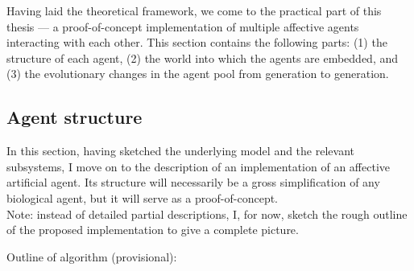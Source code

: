 Having laid the theoretical framework, we come to the practical part of this thesis --- a proof-of-concept implementation of multiple affective agents interacting with each other. This section contains the following parts: (1) the structure of each agent, (2) the world into which the agents are embedded, and (3) the evolutionary changes in the agent pool from generation to generation.

\subsection{Agent structure}

In this section, having sketched the underlying model and the relevant subsystems, I move on to the description of an implementation of an affective artificial agent. Its structure will necessarily be a gross simplification of any biological agent, but it will serve as a proof-of-concept.\\

\noindent
Note: instead of detailed partial descriptions, I, for now, sketch the rough outline of the proposed implementation to give a complete picture.

Outline of algorithm (provisional):


